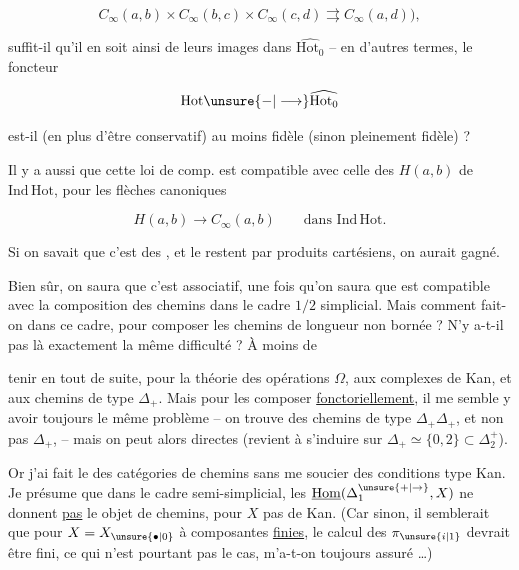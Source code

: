 \[
C_\infty(a,b)\times C_\infty(b,c)\times C_\infty(c,d)\rightrightarrows C_\infty(a,d)),
\]

suffit-il qu'il en soit ainsi de leurs images dans $\widehat{\mathrm{Hot}_0}$ -- en d'autres termes, le foncteur

\[
\mathrm{Hot}\unsure{-|\longrightarrow}\widehat{\mathrm{Hot}_0}
\]

est-il (en plus d'être conservatif) au moins fidèle (sinon pleinement fidèle) ?

Il y a aussi que cette loi de comp. est compatible avec celle des $H(a,b)$ de $\mathrm{Ind\,Hot}$, pour les flèches canoniques

\[
H(a,b)\longrightarrow C_\infty(a,b)\qquad\text{dans }\mathrm{Ind\,Hot}.
\]

Si on savait que c'est des , et le restent par produits cartésiens, on aurait gagné.

Bien sûr,  on saura que c'est associatif, une fois qu'on saura que  est compatible avec la composition des chemins dans le cadre $1/2$ simplicial. Mais comment fait-on dans ce cadre, pour composer les chemins de longueur  non bornée ? N'y a-t-il pas là exactement la même difficulté ? À moins de 


tenir en  tout de suite, pour la théorie des opérations $\Omega$, aux complexes de Kan,  et aux chemins de type $\Delta_+$. Mais pour les composer \uline{fonctoriellement}, il me semble y avoir toujours le même problème -- on trouve des chemins de type $\Delta_+\Delta_+$,  et non pas $\Delta_+$, -- mais on peut alors   directes (revient à s'induire sur $\Delta_+\simeq\{0,2\}\subset\Delta_2^+$).

Or j'ai fait le  des catégories de chemins sans me soucier des conditions  type Kan. Je présume que dans le cadre semi-simplicial, les $\underline{\mathrm{Hom}}(\Delta_1^{\unsure{+|\to}},X)$ ne donnent \uline{pas} le  objet de chemins, pour $X$ pas de Kan. (Car sinon, il semblerait que pour $X=X_{\unsure{\bullet|0}}$ à composantes \uline{finies}, le calcul des $\pi_{\unsure{i|1}}$ devrait être fini, ce qui n'est pourtant pas le cas, m'a-t-on toujours assuré \ldots)

